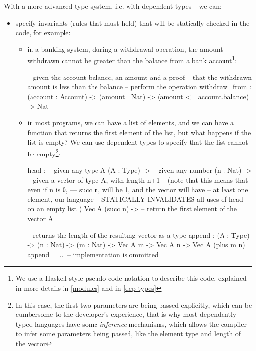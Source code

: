 With a more advanced type system, i.e. with dependent types ~\cite{advancedtapl} we can:
\begin{itemize}

       \item specify invariants (rules that must hold) that will be statically checked in the code, for example:
       \begin{itemize}
              \item in a banking system, during a withdrawal operation, the amount withdrawn cannot be greater than the balance from a bank account\footnote{We use a Haskell-style pseudo-code notation to describe this code, explained in more details in \autoref{modules} and in \autoref{dep-types}}:
             \begin{piforall}
-- given the account balance, an amount and a proof
-- that the withdrawn amount is less than the balance
-- perform the operation
withdraw_from :
       (account : Account) ->
       (amount : Nat) ->
       (amount <= account.balance) ->
       Nat
             \end{piforall}
             \item in most programs, we can have a list of elements, and we can have a function that returns the first element of the list, but what happens if the list is empty? We can use dependent types to specify that the list cannot be empty\footnote{In this case, the first two parameters are being passed explicitly, which can be cumbersome to the developer's experience, that is why most dependently-typed languages have some \emph{inference} mechanisms, which allows the compiler to infer some parameters being passed, like the element type and length of the vector}:
             \begin{piforall}

head :
       -- given any type A
       (A : Type) ->
       -- given any number
       (n : Nat) ->
       -- given a vector of type A, with length n+1
       -- (note that this means that even if n is 0,
       --- succ n, will be 1, and the vector will have
       -- at least one element, our language
       -- STATICALLY INVALIDATES  all uses of head on an empty list )
       Vec A (succ n) ->
       -- return the first element of the vector
       A

-- returns the length of the resulting vector as a type
append : (A : Type) -> (n : Nat) -> (m : Nat) -> Vec A m -> Vec A n -> Vec A (plus m n)
append = ... -- implementation is ommitted
             \end{piforall}
       \end{itemize}


\end{itemize}
